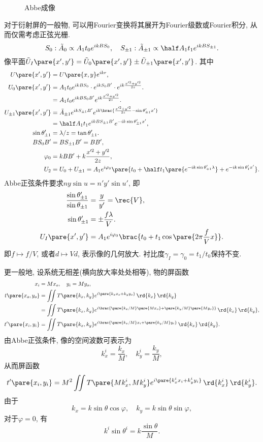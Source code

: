 \documentclass{ctexart}
\begin{document}
\begin{figure}[ht]
    \centering
    \caption{Abbe成像}
\end{figure}
对于衍射屏的一般物, 可以用Fourier变换将其展开为Fourier级数或Fourier积分, 从而仅需考虑正弦光栅.
\[ S_0: \tilde{A}_0 \propto A_1 t_0 e^{ikBS_0},\quad S_{\pm 1}: \tilde{A}_{\pm 1} \propto \half A_1 t_1 e^{ikBS_{\pm 1}}. \]
像平面$\tilde{U}_I\pare{x',y'} = \tilde{U}_0 \pare{x',y'}  \pm \tilde{U}_{\pm 1}\pare{x',y'}$. 其中
\begin{align*}
    U\pare{x',y'} &= U\pare{x,y} e^{ikr}, \\
    U_0\pare{x',y'} &= A_1 t_0 e^{ikBS_0}\cdot e^{ikS_0 B'}\cdot e^{ik \frac{x'^2 + y'^2}{2z}}. \\
    &= A_1 t_0 e^{ikBS_0 B'} e^{ik \frac{x'^2+y'^2}{2z}}. \\
    U_{\pm 1}\pare{x',y'} &= \tilde{A}_{\pm 1} e^{ikS_{\pm 1}B'} e^{ik\brac{\frac{x'^2+y'^2}{2z} - \sin\theta'_{\pm 1}x'}} \\
    &= \half A_1 t_1 e^{ikBS_{\pm 1}B'} e^{-ik\sin\theta'_{\pm 1} x'}, \\
    \sin\theta'_{\pm 1} &= \lambda / z = \tan \theta'_{\pm 1}. \\
    BS_0 B' &= BS_{\pm 1}B' = BB', \\
    \varphi_0 &= kBB' + k \frac{x'^2+y'^2}{2z}, \\
    U_2 &= U_0 + U_{\pm 1} = A_1 e^{i\varphi_0} \pare{t_0 + \half t_1 \pare{e^{-ik\sin\theta'_{+1}\lambda}} + e^{-ik\sin\theta'_1 x'}}.
\end{align*}
Abbe正弦条件要求$ny\sin u = n'y'\sin u'$, 即
\begin{align*}
    \frac{\sin \theta'_{\pm 1}}{\sin\theta_{\pm 1}} &= \frac{y}{y'} = \rec{V}, \\
    \sin \theta'_{\pm 1} &= \pm \frac{f\lambda}{V}. \\
    U_I\pare{x',y'} &= A_1 e^{i\varphi_0} \brac{t_0 + t_1 \cos\pare{2\pi \frac{f}{V}x}}.
\end{align*}
即$f\mapsto f/V$, 或者$d\mapsto Vd$, 表示像的几何放大. 衬比度$\gamma_I = \gamma_0 = t_1/t_0$保持不变.
\par
更一般地, 设系统无相差(横向放大率处处相等), 物的屏函数
\begin{align*}
    x_i &= Mx_o,\quad y_i = My_o, \\
    t\pare{x_o,y_o} &= \iint T\pare{k_x,k_y} e^{i\pare{k_x x_o + k_y y_o}}\,\rd{k_x}\,\rd{k_y} \\
    &= \iint T\pare{k_x,k_y} e^{i\brac{\pare{k_x/M}\pare{Mx_o} + \pare{k_y/M}\pare{My_o}}}\,\rd{k_x}\,\rd{k_y}, \\
    t'\pare{x_i,y_i} &= \iint T\pare{k_x,k_y} e^{i\brac{\pare{k_x/M}x_i + \pare{k_y/M}y_i}}\,\rd{k_x}\,\rd{k_y}.
\end{align*}
由Abbe正弦条件, 像的空间波数可表示为
\[ k_x^i = \frac{k_x}{M},\quad k_y^i = \frac{k_y}{M}, \]
从而屏函数
\[ t'\pare{x_i,y_i} = M^2\iint T\pare{Mk_x^i,Mk_y^i}e^{i\pare{k_x^i x_i + k_y^i y_i}}\,\rd{k_x^i}\,\rd{k_y^i}. \]
由于
\[ k_x = k\sin\theta \cos\varphi,\quad k_y = k\sin\theta \sin\varphi, \]
对于$\varphi = 0$, 有
\[ k^i \sin\theta^i = k\frac{\sin\theta}{M}. \]
\end{document}
